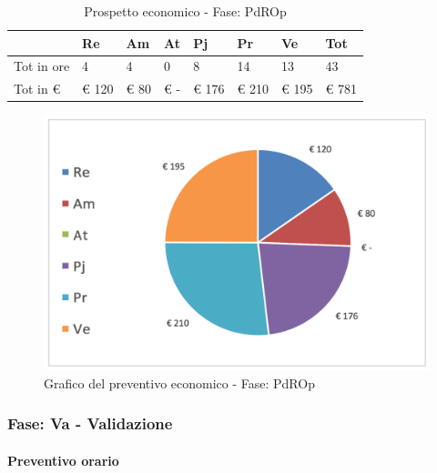 							\begin{table}[H] \begin{center} \begin{tabular}{llllllll}
							\toprule
							&	\textbf{Re}	&	\textbf{Am}	&	\textbf{At}	&	\textbf{Pj}	&	\textbf{Pr}	&	\textbf{Ve}	&	\textbf{Tot}\\

							\midrule
							Tot in ore	&	4	&	4	&	0	&	8	&	14	&	13	&	43	 \\


							Tot in €	&	 €           120 	 & 	 €          80 	 & 	 €               -   	 & 	 €        176 	 & 	 €            210 	 & 	 €        195 	 & 	 €                 781 	 \\
							\bottomrule
							\end{tabular} \end{center} \caption{Prospetto economico - Fase:
							PdROp
							}\label{tab:s_PdROp} \end{table}		\begin{figure}[H]  \centering  \includegraphics[scale=0.40]{img/s_PdROp}
									\caption{Grafico del preventivo economico - Fase: 								PdROp	}  \label{fig:s_PdROp} \end{figure}
		\newpage
		\subsubsection {Fase: Va - Validazione}
		\paragraph{Preventivo orario}

